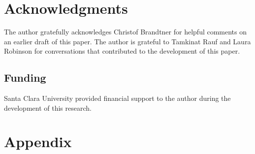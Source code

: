 \documentclass[11pt]{article}
\begin{document}
\section{Acknowledgments}\label{sec:acknowledgments}

The author gratefully acknowledges Christof Brandtner for helpful comments on an earlier draft of this paper. The author is grateful to Tamkinat Rauf and Laura Robinson for conversations that contributed to the development of this paper.

\subsection{Funding}\label{sec:funding}

Santa Clara University provided financial support to the author during the development of this research.

\newpage
\section{Appendix}





 

 



\newpage
\hypertarget{references}{%
\label{references}}
\renewcommand{\bibname}{References}



\end{document}
